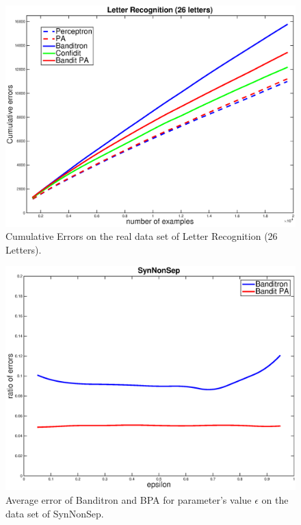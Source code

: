 \documentclass[twocolumn]{article}
\begin{document}
\begin{figure}[h!]
	\centerline{
		\includegraphics[width=\linewidth]{figs/26LR.eps}}
	\caption{Cumulative Errors  on the real data set of Letter Recognition (26 Letters).}
	\label{pic:BPALR26}
\end{figure}

\begin{figure}[h!]
	\centerline{
		\includegraphics[width=\linewidth]{figs/SynNonSep_gamma.eps}}
	\caption{Average error of Banditron and BPA for parameter's value $\epsilon$ on the data set of SynNonSep. }
	\label{pic:BPASNSerr}
\end{figure}
\end{document}
